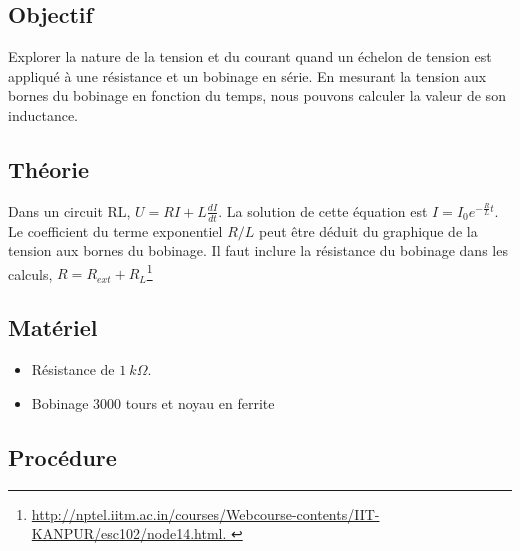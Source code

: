 \documentclass{book}
\begin{document}
\subsection{Objectif}


Explorer la nature de la tension et du courant quand un échelon de tension est appliqué à une résistance et un bobinage en série. En mesurant la tension aux bornes du bobinage en fonction du temps, nous pouvons calculer la valeur de son inductance.

\subsection{Théorie}


Dans un circuit RL, $U=RI+L\frac{dI}{dt}$. La solution de cette équation est $I=I_{0}e^{-\frac{R}{L}t}$. Le coefficient du terme exponentiel $R/L$ peut être déduit du graphique de la tension aux bornes du bobinage. Il faut inclure la résistance du bobinage dans les calculs, $R=R_{ext}+R_{L}$\footnote{\href{http://nptel.iitm.ac.in/courses/Webcourse-contents/IIT-KANPUR/esc102/node14.html}{\mbox{http://nptel.iitm.ac.in/courses/Webcourse-contents/IIT-KANPUR/esc102/node14.html}.
}
 }
\subsection{Matériel}


\begin{itemize}
  \item Résistance de $1\ k\Omega$.
  \item Bobinage 3000 tours et noyau en ferrite
\end{itemize}

\subsection{Procédure}
\end{document}
